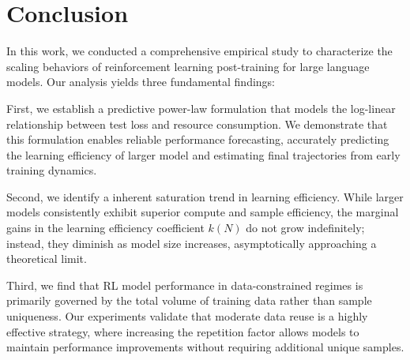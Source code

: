 \section{Conclusion}
In this work, we conducted a comprehensive empirical study to characterize the scaling behaviors of reinforcement learning post-training for large language models. Our analysis yields three fundamental findings: 

First, we establish a predictive power-law formulation that models the log-linear relationship between test loss and resource consumption. We demonstrate that this formulation enables reliable performance forecasting, accurately predicting the learning efficiency of larger model and estimating final trajectories from early training dynamics. 

Second, we identify a inherent saturation trend in learning efficiency. While larger models consistently exhibit superior compute and sample efficiency, the marginal gains in the learning efficiency coefficient $k(N)$ do not grow indefinitely; instead, they diminish as model size increases, asymptotically approaching a theoretical limit. 

Third, we find that RL model performance in data-constrained regimes is primarily governed by the total volume of training data rather than sample uniqueness. Our experiments validate that moderate data reuse is a highly effective strategy, where increasing the repetition factor allows models to maintain performance improvements without requiring additional unique samples.